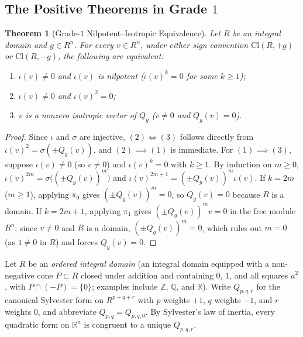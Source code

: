 \documentclass[11pt]{article}
\newtheorem{theorem}{Theorem}[section]
\theoremstyle{definition}
\newcommand{\Cl}{\mathrm{Cl}}
\newcommand{\R}{\mathbb{R}}
\newcommand{\Q}{\mathbb{Q}}
\newcommand{\Z}{\mathbb{Z}}
\begin{document}
\subsection{The Positive Theorems in Grade \texorpdfstring{$1$}{1}}

\begin{theorem}[Grade-$1$ Nilpotent--Isotropic Equivalence]\label{thm:grade1}
Let $R$ be an integral domain and $g \in R^n$. For every $v \in R^n$, under either sign
convention $\Cl(R, +g)$ or $\Cl(R, -g)$, the following are equivalent:
\begin{enumerate}
  \item $\iota(v) \ne 0$ and $\iota(v)$ is nilpotent ($\iota(v)^k = 0$ for some $k \ge 1$);
  \item $\iota(v) \ne 0$ and $\iota(v)^2 = 0$;
  \item $v$ is a nonzero isotropic vector of $Q_g$ ($v \ne 0$ and $Q_g(v) = 0$).
\end{enumerate}
\end{theorem}
\begin{proof}
Since $\iota$ and $\sigma$ are injective, $(2) \iff (3)$ follows directly from
$\iota(v)^2 = \sigma(\pm Q_g(v))$, and $(2) \implies (1)$ is immediate. For $(1) \implies (3)$,
suppose $\iota(v) \ne 0$ (so $v \ne 0$) and $\iota(v)^k = 0$ with $k \ge 1$. By
induction on $m \ge 0$, $\iota(v)^{2m} = \sigma\bigl((\pm Q_g(v))^m\bigr)$ and
$\iota(v)^{2m+1} = (\pm Q_g(v))^m \iota(v)$. If $k = 2m$ ($m \ge 1$), applying $\pi_0$
gives $(\pm Q_g(v))^m = 0$, so $Q_g(v) = 0$ because $R$ is a domain. If $k = 2m + 1$,
applying $\pi_1$ gives $(\pm Q_g(v))^m v = 0$ in the free module $R^n$; since $v \ne 0$
and $R$ is a domain, $(\pm Q_g(v))^m = 0$, which rules out $m = 0$ (as $1 \ne 0$ in $R$)
and forces $Q_g(v) = 0$.
\end{proof}

Let $R$ be an \emph{ordered integral domain} (an integral domain equipped with a
non-negative cone $P \subset R$ closed under addition and containing $0$, $1$, and all
squares $a^2$, with $P \cap (-P) = \{0\}$; examples include $\Z$, $\Q$, and $\R$). Write
$Q_{p,q,r}$ for the canonical Sylvester form on $R^{p+q+r}$ with $p$ weights $+1$, $q$
weights $-1$, and $r$ weights $0$, and abbreviate $Q_{p,q} = Q_{p,q,0}$. By Sylvester's
law of inertia, every quadratic form on $\R^n$ is congruent to a unique $Q_{p,q,r}$.
\end{document}
